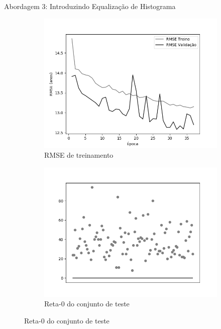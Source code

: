 \begin{frame}{\large{Abordagem 3: Introduzindo Equalização de Histograma}}
  \begin{figure}[h!]
    \caption{Resultados do treinamento e teste da CNN LeNet \emph{Leaky ReLU}}
  \begin{subfigure}[hb]{0.4\textwidth}
    \caption{RMSE de treinamento}
    \includegraphics[width=\linewidth]{img/graficos/history/lenet/fig-history-image-treat-3-lenet-lrelu-rmse.png}
  \end{subfigure}
  \begin{subfigure}[hb]{0.4\textwidth}
    \caption{Reta-0 do conjunto de teste}
   \includegraphics[width=\linewidth]{img/graficos/reta0/lenet/fig-reta-0-image-treat-3-lenet-lrelu.png}
  \end{subfigure}%
\end{figure}
\end{frame}

